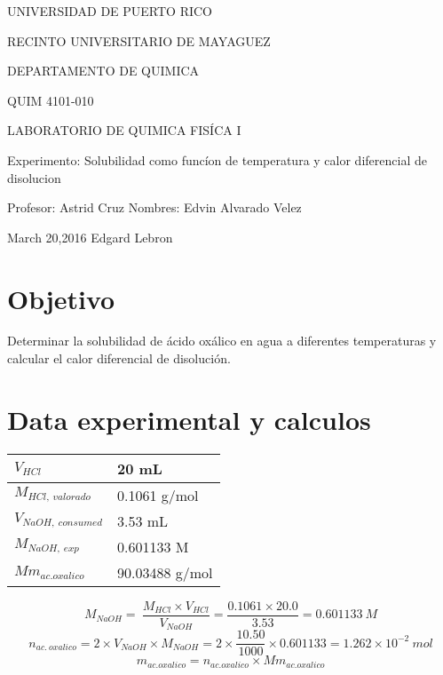 \documentclass[a4paper,12pt]{article}
\begin{document}
\begin{titlepage}
	\centering
	{\Large UNIVERSIDAD DE PUERTO RICO}
	
	{\Large RECINTO UNIVERSITARIO DE MAYAGUEZ}
	
	{\Large DEPARTAMENTO DE QUIMICA}
	\vspace{1cm}
	
	{\large QUIM 4101-010} 
	
	{\large LABORATORIO DE QUIMICA FIS\'ICA I}
	\vfill
	
	{\large Experimento: Solubilidad como func\'ion de temperatura y calor diferencial de disolucion}
	\vfill
	
	Profesor: Astrid Cruz \hspace{6cm} Nombres: Edvin Alvarado Velez
	
	March 20,2016 \hspace{8cm} Edgard Lebron			
\end{titlepage}
\section{Objetivo}

	Determinar la solubilidad de \'acido ox\'alico en agua a diferentes temperaturas y calcular el calor diferencial de disoluci\'on.

\section{Data experimental y calculos}

\begin{table}[hbtp]
	\centering
		\begin{tabular}{|l|l|} \hline 
		$V_{HCl}$ & 20 mL \\ \hline 
		$M_{HCl,\ valorado}$ & 0.1061 g/mol \\ \hline 
		$V_{NaOH,\ consumed}$ & 3.53 mL \\ \hline 
		$M_{NaOH,\ exp}$ & 0.601133 M \\ \hline 
		${Mm}_{ac.oxalico}$ & 90.03488 g/mol \\ \hline 
	\end{tabular}
\end{table}

\vspace{1cm}

\[M_{NaOH}=\ \frac{M_{HCl}\times V_{HCl}}{V_{NaOH}}=\frac{0.1061\times 20.0}{3.53}=0.601133\ M\] 
\[n_{ac.\ oxalico}=2\times V_{NaOH}\times M_{NaOH}=2\times \frac{10.50}{1000}\times 0.601133=1.262\times {10}^{-2}\ mol\] 
\[m_{ac.oxalico}=n_{ac.oxalico}\times {Mm}_{ac.oxalico}\] 
\end{document}
